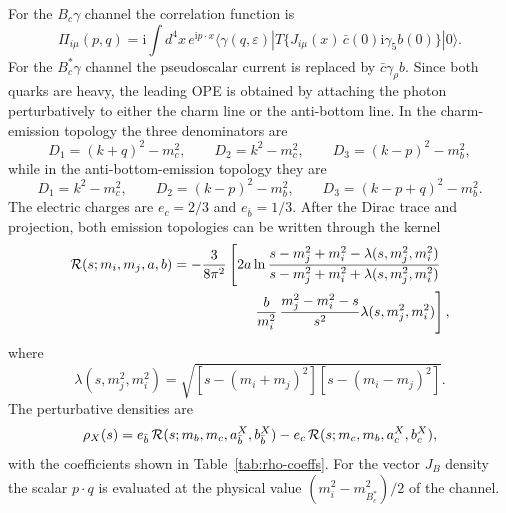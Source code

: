\documentclass[aps,prd,preprint,nofootinbib,superscriptaddress]{revtex4-2}
\newcommand{\ii}{\mathrm{i}}
\newcommand{\Bc}{B_c}
\newcommand{\Bcst}{B_c^\ast}
\begin{document}
For the \(\Bc\gamma\) channel the correlation function is
\begin{equation}
  \Pi_{i\mu}(p,q)=\ii\int d^4x\,e^{\ii p\cdot x}
  \langle \gamma(q,\varepsilon)|
  T\{J_{i\mu}(x)\,\bar c(0)\ii\gamma_5 b(0)\}|0\rangle .
  \label{eq:ps-correlator}
\end{equation}
For the \(\Bcst\gamma\) channel the pseudoscalar current is replaced by
\(\bar c\gamma_\rho b\).  Since both quarks are heavy, the leading OPE is
obtained by attaching the photon perturbatively to either the charm line or
the anti-bottom line.  In the charm-emission topology the three denominators
are
\begin{equation}
  D_1=(k+q)^2-m_c^2,\qquad D_2=k^2-m_c^2,\qquad
  D_3=(k-p)^2-m_b^2 ,
  \label{eq:c-denominators}
\end{equation}
while in the anti-bottom-emission topology they are
\begin{equation}
  D_1=k^2-m_c^2,\qquad D_2=(k-p)^2-m_b^2,\qquad
  D_3=(k-p+q)^2-m_b^2 .
  \label{eq:b-denominators}
\end{equation}
The electric charges are \(e_c=2/3\) and \(e_{\bar b}=1/3\).  After the
Dirac trace and projection, both emission topologies can be written through
the kernel
\begin{align}
{\cal R}(s;m_i,m_j,a,b)
&=-\frac{3}{8\pi^2}
\left[
2a\ln\frac{s-m_j^2+m_i^2-\lambda(s,m_j^2,m_i^2)}
{s-m_j^2+m_i^2+\lambda(s,m_j^2,m_i^2)}
\right. \nonumber\\
&\hspace{2.0cm}\left.
\frac{b}{m_i^2}\,
\frac{m_j^2-m_i^2-s}{s^2}\lambda(s,m_j^2,m_i^2)
\right],
\label{eq:kernel}
\end{align}
where
\[
\lambda(s,m_j^2,m_i^2)=
\sqrt{[s-(m_i+m_j)^2][s-(m_i-m_j)^2]} .
\]
The perturbative densities are
\begin{equation}
  \rho_X(s)=e_{\bar b}\,{\cal R}(s;m_b,m_c,a_{\bar b}^X,b_{\bar b}^X)
  -e_c\,{\cal R}(s;m_c,m_b,a_c^X,b_c^X),
  \label{eq:rho-master}
\end{equation}
with the coefficients shown in Table~\ref{tab:rho-coeffs}.  For the vector
\(J_B\) density the scalar \(p\cdot q\) is evaluated at the physical value
\((m_i^2-m_{\Bcst}^2)/2\) of the channel.
\end{document}
